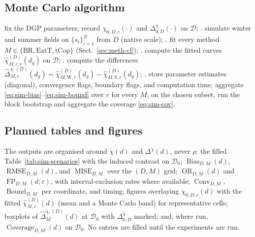 \subsection{Monte Carlo algorithm}\label{sec:sim-alg}

\begin{algorithm}[t]
  \caption{Three-method Monte Carlo benchmark (one DGP at a time)}
  \label{alg:sim-mc}
  \begin{algorithmic}[1]
    \State fix the DGP parameters; record \(\chi_{0,D,c}(\cdot)\) and \(\Delta_{0,D}^{\chi}(\cdot)\) on \(\mathcal D\);
    . simulate winter and summer fields on \(\{s_i\}_{i=1}^N\) from \(D\) (native scale);
    . fit every method \(M\in\{\mathrm{BR},\mathrm{ExtT},\mathrm{tCop}\}\) (Sect.~\ref{sec:meth-cl});
    . compute the fitted curves \(\widehat\chi_{M,c,r}^{(D)}(d_g)\) on \(\mathcal D\);
    . compute the differences \(\widehat\Delta_{M,r}^{\chi,(D)}(d_g)=\widehat\chi_{M,\mathrm W,r}^{(D)}(d_g)-\widehat\chi_{M,\mathrm S,r}^{(D)}(d_g)\);
    . store parameter estimates (diagonal), convergence flags, boundary flags, and computation time;
    \EndFor
    \State aggregate \eqref{eq:sim-bias}--\eqref{eq:sim-bound} over \(r\) for every \(M\);
    \EndFor
    \EndFor
    \State on the chosen subset, run the block bootstrap and aggregate the coverage \eqref{eq:sim-cov}.
  \end{algorithmic}
\end{algorithm}

\subsection{Planned tables and figures}\label{sec:sim-outputs}

The outputs are organised around \(\chi(d)\) and \(\Delta^{\chi}(d)\), never \(\rho\): the filled Table~\ref{tab:sim-scenarios} with the induced contrast on \(\mathcal D_0\); \(\operatorname{Bias}_{D,M}(d)\), \(\operatorname{RMSE}_{D,M}(d)\), and \(\operatorname{MISE}_{D,M}\) over the \((D,M)\) grid; \(\operatorname{OR}_{D,M}(d)\) and \(\operatorname{FP}_{D,M}(d;\varepsilon)\), with interval-exclusion rates where available; \(\operatorname{Conv}_{D,M}\), \(\operatorname{Bound}_{D,M}\) per coordinate, and timing; figures overlaying \(\chi_{0,D,c}(d)\) with the fitted \(\widehat\chi_{M,c}^{(D)}(d)\) (mean and a Monte Carlo band) for representative cells; boxplots of \(\widehat\Delta_M^{\chi,(D)}(d)\) at \(\mathcal D_0\) with \(\Delta_{0,D}^{\chi}\) marked; and, where run, \(\operatorname{Coverage}_{D,M}(d)\) on \(\mathcal D_0\). No entries are filled until the experiments are run.

